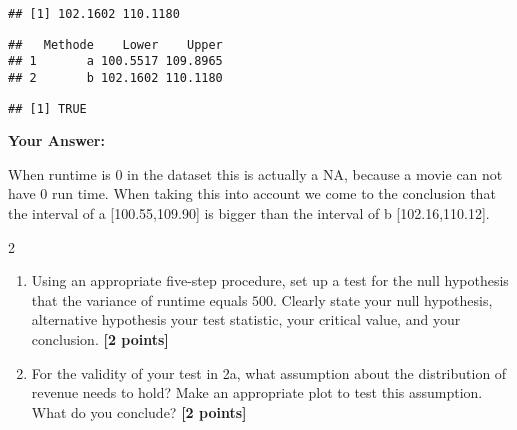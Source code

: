 \documentclass[
]{article}
\newenvironment{Shaded}{\begin{snugshade}}{\end{snugshade}}
\newcommand{\AttributeTok}[1]{\textcolor[rgb]{0.13,0.29,0.53}{#1}}
\newcommand{\FunctionTok}[1]{\textcolor[rgb]{0.13,0.29,0.53}{\textbf{#1}}}
\newcommand{\NormalTok}[1]{#1}
\newcommand{\OtherTok}[1]{\textcolor[rgb]{0.56,0.35,0.01}{#1}}
\newcommand{\SpecialCharTok}[1]{\textcolor[rgb]{0.81,0.36,0.00}{\textbf{#1}}}
\newcommand{\StringTok}[1]{\textcolor[rgb]{0.31,0.60,0.02}{#1}}
\providecommand{\tightlist}{%
  \setlength{\itemsep}{0pt}\setlength{\parskip}{0pt}}
\begin{document}
\begin{verbatim}
## [1] 102.1602 110.1180
\end{verbatim}

\begin{Shaded}
\end{Shaded}

\begin{verbatim}
##   Methode    Lower    Upper
## 1       a 100.5517 109.8965
## 2       b 102.1602 110.1180
\end{verbatim}

\begin{Shaded}
\end{Shaded}

\begin{verbatim}
## [1] TRUE
\end{verbatim}

\textbf{Your Answer:}

When runtime is 0 in the dataset this is actually a NA, because a movie
can not have 0 run time. When taking this into account we come to the
conclusion that the interval of a {[}100.55,109.90{]} is bigger than the
interval of b {[}102.16,110.12{]}.

2

\begin{enumerate}
\def\labelenumi{\alph{enumi}.}
\tightlist
\item
  Using an appropriate five-step procedure, set up a test for the null
  hypothesis that the variance of runtime equals \(500\). Clearly state
  your null hypothesis, alternative hypothesis your test statistic, your
  critical value, and your conclusion. \textbf{[2 points]}
\item
  For the validity of your test in 2a, what assumption about the
  distribution of revenue needs to hold? Make an appropriate plot to
  test this assumption. What do you conclude? \textbf{[2 points]}
\end{enumerate}
\end{document}
